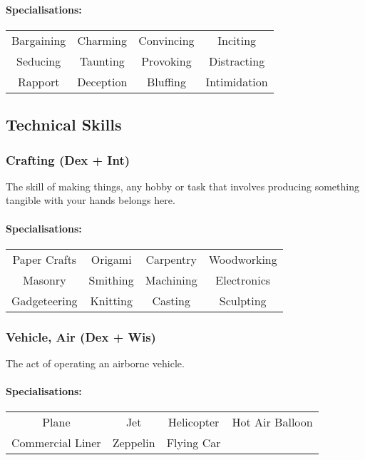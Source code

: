 \paragraph{Specialisations:}
\begin{center}
    \begin{tabular}{c|c|c|c}
        Bargaining & Charming & Convincing & Inciting \\
        Seducing & Taunting & Provoking & Distracting \\
        Rapport & Deception & Bluffing & Intimidation
    \end{tabular}
\end{center}

\subsection{Technical Skills}
\subsubsection{Crafting (Dex + Int)}
The skill of making things, any hobby or task that involves producing something tangible with your hands belongs here.

\paragraph{Specialisations:}
\begin{center}
    \begin{tabular}{c|c|c|c}
        Paper Crafts & Origami & Carpentry & Woodworking \\
        Masonry & Smithing & Machining & Electronics \\
        Gadgeteering & Knitting & Casting & Sculpting \\
    \end{tabular}
\end{center}

\subsubsection{Vehicle, Air (Dex + Wis)}
The act of operating an airborne vehicle.

\paragraph{Specialisations:}
\begin{center}
    \begin{tabular}{c|c|c|c}
        Plane & Jet & Helicopter & Hot Air Balloon \\
        Commercial Liner & Zeppelin & Flying Car \\
    \end{tabular}
\end{center}


